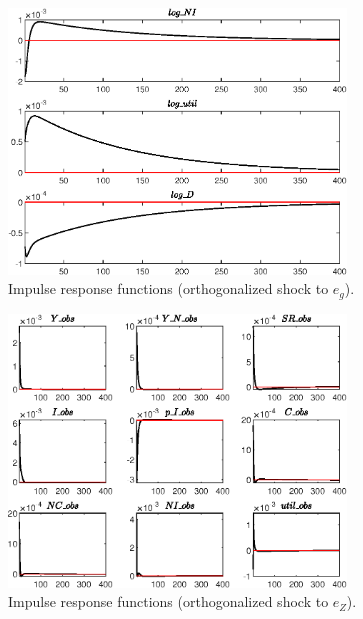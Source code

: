 \begin{figure}[H]
\centering 
\includegraphics[width=0.80\textwidth]{BRS_growth/graphs/BRS_growth_IRF_e_g3}
\caption{Impulse response functions (orthogonalized shock to ${e_g}$).}\label{Fig:IRF:e_g:3}
\end{figure}
 
\begin{figure}[H]
\centering 
\includegraphics[width=0.80\textwidth]{BRS_growth/graphs/BRS_growth_IRF_e_Z1}
\caption{Impulse response functions (orthogonalized shock to ${e_Z}$).}\label{Fig:IRF:e_Z:1}
\end{figure}
 
